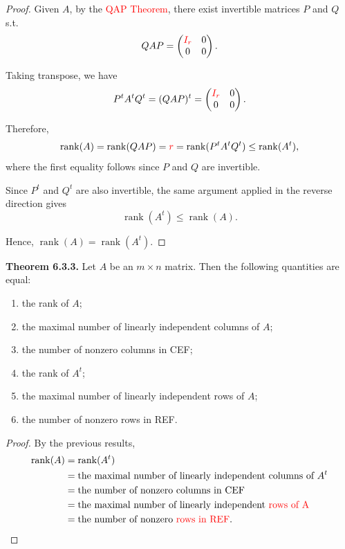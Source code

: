 \documentclass[12pt]{article}
\begin{document}
\begin{proof}
Given $A$, by the \textcolor{red}{QAP Theorem}, there exist invertible matrices
$P$ and $Q$ s.t.
\[
QAP=
\begin{pmatrix}
\textcolor{red}{I_r} & 0\\
0 & 0
\end{pmatrix}.
\]

Taking transpose, we have
\[
P^tA^tQ^t
=
(QAP)^t
=
\begin{pmatrix}
\textcolor{red}{I_r} & 0\\
0 & 0
\end{pmatrix}.
\]

Therefore,
\[
\operatorname{rank}(A)
=
\operatorname{rank}(QAP)
=
\textcolor{red}{r}
=
\operatorname{rank}(P^tA^tQ^t)
\leq
\operatorname{rank}(A^t),
\]
where the first equality follows since $P$ and $Q$ are invertible.

Since $P^t$ and $Q^t$ are also invertible, the same argument applied
in the reverse direction gives
\[
\operatorname{rank}(A^t)
\leq
\operatorname{rank}(A).
\]

Hence, $\operatorname{rank}(A)=\operatorname{rank}(A^t)$.
\end{proof}

\textbf{Theorem 6.3.3.}
Let $A$ be an $m\times n$ matrix. Then the following quantities are equal:

\begin{enumerate}
    \item the rank of $A$;
    \item the maximal number of linearly independent columns of $A$;
    \item the number of nonzero columns in CEF;
    \item the rank of $A^t$;
    \item the maximal number of linearly independent rows of $A$;
    \item the number of nonzero rows in REF.
\end{enumerate}

\begin{proof}
By the previous results,
\begin{align*}
\operatorname{rank}(A)
&= \operatorname{rank}(A^t) \\
&= \text{the maximal number of linearly independent columns of } A^t \\
&= \text{the number of nonzero columns in CEF} \\
&= \text{the maximal number of linearly independent} \textcolor{red}{\text{ rows of A}} \\
&= \text{the number of nonzero} \textcolor{red}{\text{ rows in REF}}.
\end{align*}
\end{proof}
\end{document}
